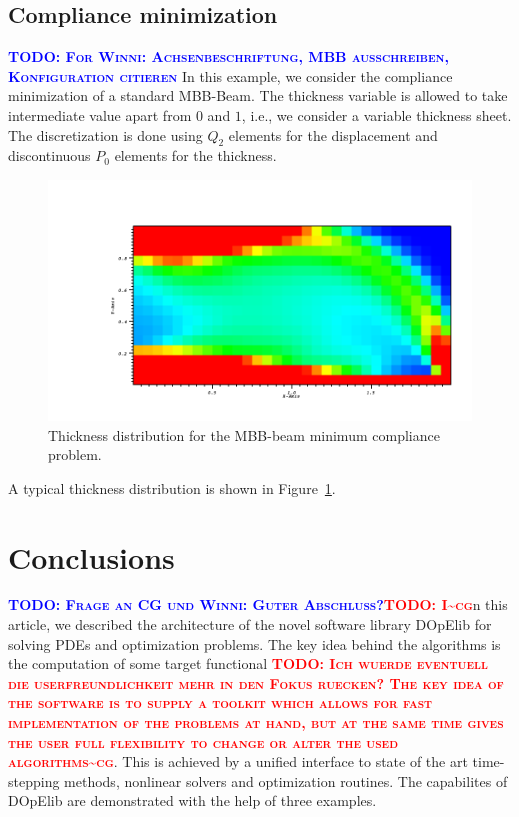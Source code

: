 \documentclass[smallextended]{svjour3}       %
\numberwithin{equation}{section}
\newcommand{\todo}[1]{\textbf{\textsc{\textcolor{blue}{TODO: #1}}}}
\newcommand{\todocg}[1]{\textbf{\textsc{\textcolor{red}{TODO: #1\textasciitilde cg}}}}
\begin{document}
\subsection{Compliance minimization}
\todo{For Winni: Achsenbeschriftung, MBB ausschreiben, 
Konfiguration citieren}
In this example, we consider the compliance minimization of a standard MBB-Beam. 
The thickness variable is allowed to take intermediate value apart from $0$ and $1$,
i.e., we consider a variable thickness sheet. The discretization is done 
using $Q_2$ elements for the displacement and discontinuous $P_0$ elements for the 
thickness.
\begin{figure}
\centering
\includegraphics[width=1.\textwidth, viewport=150 0 1024 500, clip]{Pictures/MBB.png}
\caption{Thickness distribution for the MBB-beam minimum compliance problem.} 
\label{res:mbb}
\end{figure}
A typical thickness distribution is shown in Figure~\ref{res:mbb}.

\section{Conclusions}
\todo{Frage an CG und Winni: Guter Abschluss?}\todocg
In this article, we described the architecture 
of the novel software library DOpElib for solving 
PDEs and optimization problems.  The key idea behind 
the algorithms is the computation of some target 
functional \todocg{Ich wuerde eventuell die userfreundlichkeit mehr in den Fokus ruecken? The key idea of the software is to supply a toolkit which allows for fast implementation of the problems at hand, but at the same time gives the user full flexibility to change or alter the used algorithms}. This is achieved by a unified interface 
to state of the art time-stepping methods, nonlinear solvers and optimization
routines. The capabilites of DOpElib are demonstrated with the help of three examples.
\end{document}
